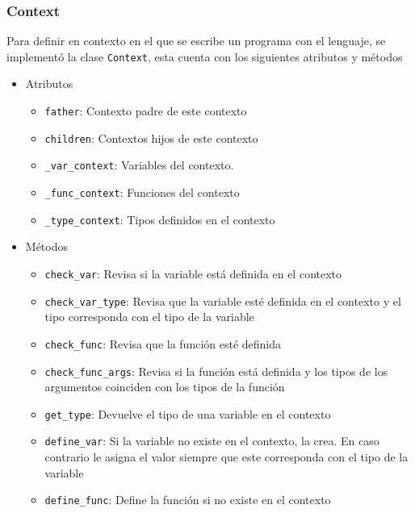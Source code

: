 \subsubsection{Context}
Para definir en contexto en el que se escribe un programa con el lenguaje, se implement\'o la clase \verb|Context|, esta cuenta con los siguientes atributos y m\'etodos 
\begin{itemize}
\item Atributos
\begin{itemize}
\item \verb|father|: Contexto padre de este contexto

\item \verb|children|: Contextos hijos de este contexto

\item \verb|_var_context|: Variables del contexto. 

\item \verb|_func_context|: Funciones del contexto

\item \verb|_type_context|: Tipos definidos en el contexto
\end{itemize}

\item M\'etodos
\begin{itemize}
\item \verb|check_var|: Revisa si la variable est\'a definida en el contexto

	\item \verb|check_var_type|: Revisa que la variable est\'e definida en el contexto y el tipo corresponda con el tipo de la variable
	
	\item \verb|check_func|: Revisa que la funci\'on est\'e definida
	
	\item \verb|check_func_args|: Revisa si la funci\'on est\'a definida y los tipos de los argumentos coinciden con los tipos de la funci\'on
	
	\item \verb|get_type|: Devuelve el tipo de una variable en el contexto
	
	\item \verb|define_var|: Si la variable no existe en el contexto, la crea. En caso contrario le asigna el valor siempre que este corresponda con el tipo de la variable
	
	\item \verb|define_func|: Define la funci\'on si no existe en el contexto
	

\end{itemize}
\end{itemize}
